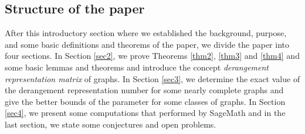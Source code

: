 \documentclass[11pt,letterpaper]{article}
\begin{document}
{\subsection{Structure of the paper}
		After this introductory section where we established the background, purpose, and some basic definitions and theorems of the paper, we divide the paper into four sections. In Section \ref{sec2}, we prove Theorems \ref{thm2}, \ref{thm3} and \ref{thm4} and some basic lemmas and theorems and introduce the concept {\it derangement representation matrix} of graphs. In Section \ref{sec3}, we determine the exact value of the derangement representation number for some nearly complete graphs and give the better bounds of the parameter for some classes of graphs. In Section \ref{sec4}, we present some computations that performed by SageMath \cite{sagemath} and in the last section, we state some conjectures and open problems.
}
\end{document}
